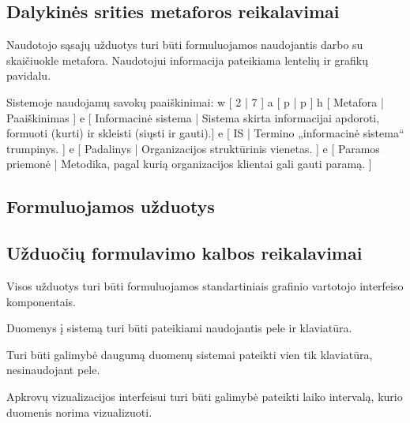 \subsection{Dalykinės srities metaforos reikalavimai}
{
  Naudotojo sąsajų užduotys turi būti formuluojamos naudojantis darbo
  su skaičiuokle metafora. Naudotojui informacija pateikiama lentelių
  ir grafikų pavidalu.
  
  Sistemoje naudojamų savokų paaiškinimai:
  \xtable
  {
    w [ 2 | 7 ]
    a [ p | p ]
    h [ Metafora | Paaiškinimas ]
    e [ Informacinė sistema |
      Sistema skirta informacijai apdoroti, formuoti (kurti) ir skleisti
      (siųsti ir gauti).]
    e [ IS | Termino „informacinė sistema“ trumpinys. ]
    e [ Padalinys | Organizacijos struktūrinis vienetas. ]
    e [ Paramos priemonė |
      Metodika, pagal kurią organizacijos klientai gali gauti paramą. ]
  }
}

\subsection{Formuluojamos užduotys}

\subsection{Užduočių formulavimo kalbos reikalavimai}
{Visos užduotys turi būti formuluojamos standartiniais grafinio vartotojo interfeiso 
komponentais.}

{Duomenys į sistemą turi būti pateikiami naudojantis pele ir klaviatūra.}

{Turi būti galimybė daugumą duomenų sistemai pateikti vien tik klaviatūra, nesinaudojant pele.}

{Apkrovų vizualizacijos interfeisui turi būti galimybė pateikti laiko intervalą, kurio duomenis 
  norima vizualizuoti.}

